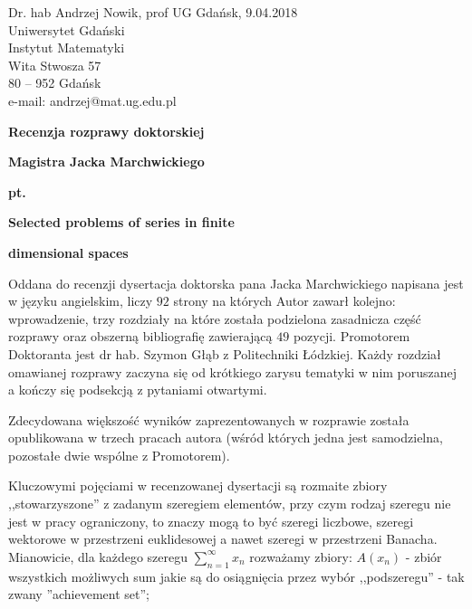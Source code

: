 \documentclass[12pt]{article}
\begin{document}

\begin{flushleft}
Dr. hab Andrzej Nowik, prof UG \hfill Gdańsk, 9.04.2018 \\
Uniwersytet Gdański \\
Instytut Matematyki \\
Wita Stwosza 57 \\
80 -- 952 Gdańsk \\
e-mail: andrzej@mat.ug.edu.pl\\
\end{flushleft}
\vspace{3mm}
\begin{center}{\bf \LARGE
Recenzja rozprawy doktorskiej }
\end{center}
\begin{center}
{\LARGE \bf
Magistra Jacka Marchwickiego
}
\end{center}
\begin{center}
\bf \Large pt.
\end{center}
\begin{center} \LARGE
\bf Selected problems of series in finite
\end{center}

\begin{center} \LARGE
\bf dimensional spaces
\end{center}


  Oddana do recenzji dysertacja doktorska pana Jacka Marchwickiego 
napisana jest w języku angielskim, liczy $92$
strony na których Autor zawarł kolejno: wprowadzenie, trzy
rozdzia\-ły na które została podzielona zasadnicza część rozprawy 
oraz obszerną biblio\-grafię zawie\-ra\-ją\-cą
$49$ pozycji. Promotorem Doktoranta jest dr hab. Szymon Głąb
z Politechniki Łódzkiej. Każdy rozdział omawianej rozprawy 
zaczyna się od krótkiego zarysu tematyki w nim poruszanej
a kończy się podsekcją z pytaniami otwartymi.

  Zdecydowana większość wyników zaprezentowanych w rozprawie
została opublikowana w trzech pracach autora (wśród których
jedna jest samodzielna, pozostałe dwie wspólne z Promotorem).

  Kluczowymi pojęciami w recenzowanej dysertacji są
rozmaite zbiory ,,stowarzyszone'' z zadanym szeregiem
elementów, przy czym rodzaj szeregu nie jest w pracy ograniczony,
to znaczy mogą to być szeregi liczbowe, szeregi wektorowe w 
przestrzeni euklidesowej a nawet szeregi w przestrzeni Banacha.
  Mianowicie, dla każdego szeregu $\sum_{n=1}^\infty x_n$
rozważamy zbiory:
$A(x_n)$ - zbiór wszystkich możliwych sum jakie są
do osiągnięcia przez wybór ,,podszeregu'' - tak zwany
''achievement set'';
\end{document}
